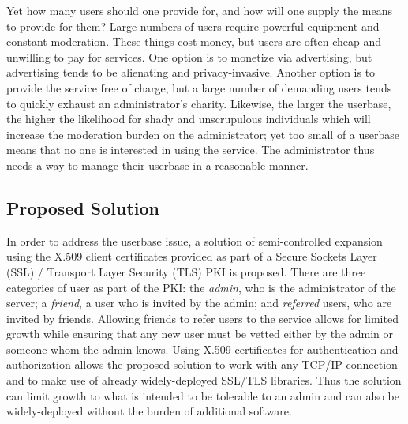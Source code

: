 \documentclass{article}
\begin{document}
Yet how many users should one provide for, and how will one supply the means to provide for them?  Large numbers of users require powerful equipment and constant moderation.  These things cost money, but users are often cheap and unwilling to pay for services.  One option is to monetize via advertising, but advertising tends to be alienating and privacy-invasive.  Another option is to provide the service free of charge, but a large number of demanding users tends to quickly exhaust an administrator's charity.  Likewise, the larger the userbase, the higher the likelihood for shady and unscrupulous individuals which will increase the moderation burden on the administrator; yet too small of a userbase means that no one is interested in using the service.  The administrator thus needs a way to manage their userbase in a reasonable manner.

\subsection{Proposed Solution}
In order to address the userbase issue, a solution of semi-controlled expansion using the X.509 client certificates provided as part of a Secure Sockets Layer (SSL) / Transport Layer Security (TLS) PKI is proposed.  There are three categories of user as part of the PKI: the \emph{admin}, who is the administrator of the server; a \emph{friend}, a user who is invited by the admin; and \emph{referred} users, who are invited by friends.  Allowing friends to refer users to the service allows for limited growth while ensuring that any new user must be vetted either by the admin or someone whom the admin knows.  Using X.509 certificates for authentication and authorization allows the proposed solution to work with any TCP/IP connection and to make use of already widely-deployed SSL/TLS libraries.  Thus the solution can limit growth to what is intended to be tolerable to an admin and can also be widely-deployed without the burden of additional software.
\end{document}

